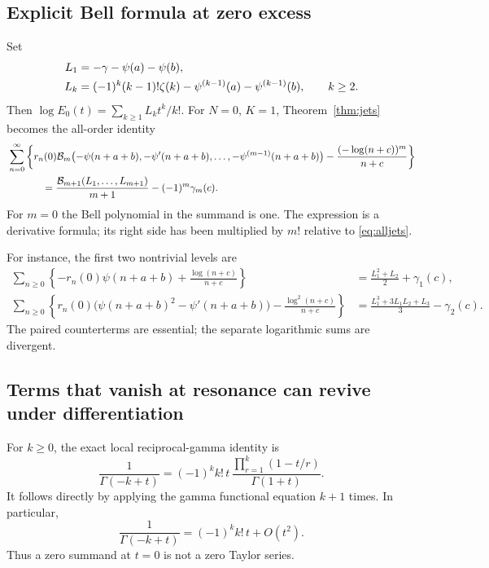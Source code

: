 \subsection{Explicit Bell formula at zero excess}
Set
\begin{align}
 L_1&=-\gamma-\psi(a)-\psi(b),\notag\\
 L_k&=(-1)^k(k-1)!\zeta(k)-\psi^{(k-1)}(a)-\psi^{(k-1)}(b),
 \qquad k\ge2.\label{eq:Lk}
\end{align}
Then $\log E_0(t)=\sum_{k\ge1}L_k t^k/k!$.
For $N=0$, $K=1$, Theorem~\ref{thm:jets} becomes the all-order identity
\begin{align}
 &\sum_{n=0}^\infty\left\{
 r_n(0)\Bcal_m\bigl(-\psi(n+a+b),-\psi'(n+a+b),\ldots,
                    -\psi^{(m-1)}(n+a+b)\bigr)
 -\frac{(-\log(n+c))^m}{n+c}\right\}\notag\\
 &\hspace{12mm}=
 \frac{\Bcal_{m+1}(L_1,\ldots,L_{m+1})}{m+1}
 -(-1)^m\gamma_m(c).
 \label{eq:Bellzero}
\end{align}
For $m=0$ the Bell polynomial in the summand is one.
The expression is a derivative formula; its right side has been multiplied
by $m!$ relative to \eqref{eq:alljets}.

For instance, the first two nontrivial levels are
\begin{align}
 \sum_{n\ge0}\left\{-r_n(0)\psi(n+a+b)
              +\frac{\log(n+c)}{n+c}\right\}
 &=\frac{L_1^2+L_2}{2}+\gamma_1(c),\label{eq:Bellone}\\
 \sum_{n\ge0}\left\{r_n(0)\bigl(\psi(n+a+b)^2-\psi'(n+a+b)\bigr)
              -\frac{\log^2(n+c)}{n+c}\right\}
 &=\frac{L_1^3+3L_1L_2+L_3}{3}-\gamma_2(c).
 \label{eq:Belltwo}
\end{align}
The paired counterterms are essential; the separate logarithmic sums
are divergent.

\subsection{Terms that vanish at resonance can revive under differentiation}
For $k\ge0$, the exact local reciprocal-gamma identity is
\begin{equation}\label{eq:rgamma}
 \frac1{\Gamma(-k+t)}
 =(-1)^k k!\,t\,
 \frac{\displaystyle\prod_{r=1}^k(1-t/r)}{\Gamma(1+t)}.
\end{equation}
It follows directly by applying the gamma functional equation $k+1$
times.  In particular,
\begin{equation}\label{eq:rgammafirst}
 \frac1{\Gamma(-k+t)}=(-1)^k k!\,t+O(t^2).
\end{equation}
Thus a zero summand at $t=0$ is not a zero Taylor series.

